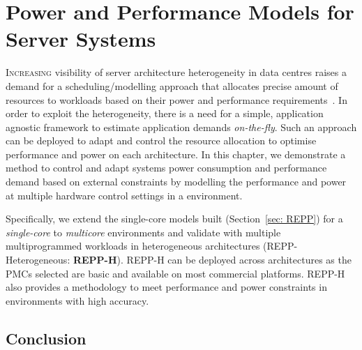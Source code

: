 \chapter{Power and Performance Models for Server Systems} 

\label{section: REPP-H} 


\lettrine{I}{ncreasing} visibility of server architecture heterogeneity in data centres
raises a demand for a scheduling/modelling approach that allocates precise amount of
resources to workloads based on their power and performance
requirements~\citep{Mars2013Whare-map, Nishtala:HPCA, Petrucci2015Octopus-Man:Computers,
Kasture2015Rubik, Lo2015Heracles}. In order to exploit the heterogeneity, there is a need
for a simple, application agnostic framework to estimate application demands
\emph{on-the-fly}. Such an approach can be deployed to adapt and control the resource
allocation to optimise performance and power on each architecture. In this chapter, we
demonstrate a method to control and adapt systems power consumption and performance demand
based on external constraints by modelling the performance and power at multiple hardware
control settings in a \muc environment.





Specifically, we extend the single-core models built (Section~\ref{sec: REPP}) for a
\emph{single-core} to \emph{multicore} environments and validate with multiple
multiprogrammed workloads in heterogeneous architectures (REPP- Heterogeneous:
\textbf{REPP-H}). REPP-H can be deployed across architectures as the PMCs selected are
basic and available on most commercial platforms.  REPP-H also provides a methodology to
meet performance and power constraints in \muc environments with high accuracy.  





\section{Conclusion} 
\label{subsection: conclusion}


